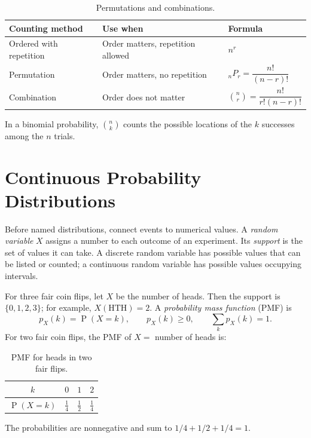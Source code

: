 \documentclass[11pt]{article}
\newcommand{\Pp}{\operatorname{P}}
\begin{document}
\begin{table}[ht]
\centering
\caption{Permutations and combinations.}\label{tab:perm-comb}
\begin{tabularx}{\textwidth}{@{}lYY@{}}
\toprule
Counting method & Use when & Formula \\
\midrule
Ordered with repetition & Order matters, repetition allowed & $n^r$ \\
Permutation & Order matters, no repetition & ${}_nP_r=\dfrac{n!}{(n-r)!}$ \\
Combination & Order does not matter & $\binom{n}{r}=\dfrac{n!}{r!(n-r)!}$ \\
\bottomrule
\end{tabularx}
\end{table}

\begin{keybox}
In a binomial probability, $\binom{n}{k}$ counts the possible locations of the
$k$ successes among the $n$ trials.
\end{keybox}

\section{Continuous Probability Distributions}\label{sec:continuous}
Before named distributions, connect events to numerical values.  A \emph{random
variable} $X$ assigns a number to each outcome of an experiment.  Its
\emph{support} is the set of values it can take.  A discrete random variable has
possible values that can be listed or counted; a continuous random variable has
possible values occupying intervals.

For three fair coin flips, let $X$ be the number of heads.  Then the support is
$\{0,1,2,3\}$; for example, $X(\text{HTH})=2$.  A \emph{probability mass
function} (PMF) is
\[
p_X(k)=\Pp(X=k),\qquad p_X(k)\geq0,
\qquad \sum_k p_X(k)=1.
\]
For two fair coin flips, the PMF of $X=$ number of heads is:
\begin{table}[ht]
\centering
\caption{PMF for heads in two fair flips.}\label{tab:pmf-heads}
\begin{tabular}{@{}cccc@{}}
\toprule
$k$ & $0$ & $1$ & $2$ \\
\midrule
$\Pp(X=k)$ & $\frac14$ & $\frac12$ & $\frac14$ \\
\bottomrule
\end{tabular}
\end{table}
The probabilities are nonnegative and sum to $1/4+1/2+1/4=1$.
\end{document}
